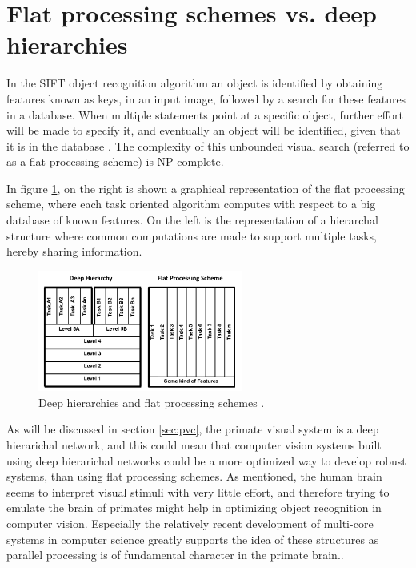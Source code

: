 \section{Flat processing schemes vs. deep hierarchies}
\label{sec:deep_hierarchies}
In the SIFT object recognition algorithm an object is identified
by obtaining features known as keys, in an input image,
followed by a search for these features in a database.
When multiple statements point at a specific object,
further effort will be made to specify it, and eventually an object will be identified,
given that it is in the database \citep{sift}.
The complexity of this unbounded visual search (referred to as a flat processing scheme)
is NP complete\citep{fidler2009learning}.

In figure \ref{fig:deepvsflat}, on the right is shown a graphical representation of the flat processing scheme,
where each task oriented algorithm computes with respect to a big database of known features.
On the left is the representation of a hierarchal structure where common computations are made to support multiple tasks,
hereby sharing information.

\begin{figure}[h!] %
\centering
\includegraphics[width=0.6\textwidth]{graphics/deepvsflat}
\caption[Deep hierarchies and flat processing schemes]{Deep hierarchies and flat processing schemes 
\citep[fig.~1]{kruger2013deep}. } 
\label{fig:deepvsflat}
\end{figure}

As will be discussed in section \ref{sec:pvc}, the primate visual system
is a deep hierarichal network, and this could mean that
computer vision systems built using deep hierarichal networks could
be a more optimized way to develop robust systems, than using flat processing schemes.
As mentioned, the human brain seems to interpret visual stimuli with very little effort,
and therefore trying to emulate the brain of primates might help in optimizing object recognition in computer vision.
Especially the relatively recent development of multi-core systems in computer science
greatly supports the idea of these structures as parallel processing is of fundamental character in the primate brain.\citep{fidler2009learning}.

